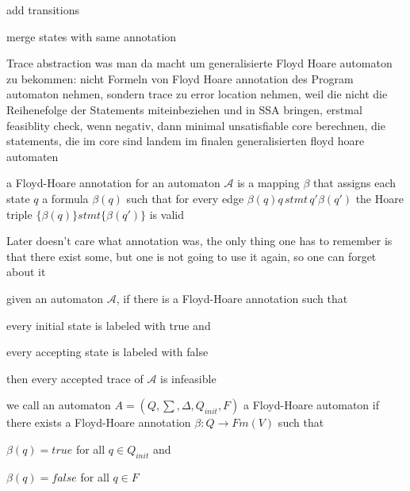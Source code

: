 \documentclass[a4paper]{article}
\begin{document}
\begin{minipage}[t]{0.16\linewidth}
\begin{betterlist}
{{\begin{betterlist}
\begin{enumerate}
					\end{enumerate}
					\begin{betterlist}
            \item \alert{Trace abstraction was man da macht um generalisierte Floyd Hoare automaton zu bekommen:} nicht Formeln von Floyd Hoare annotation des Program automaton nehmen, sondern trace zu error location nehmen, weil die nicht die Reihenefolge der Statements miteinbeziehen und in SSA bringen, erstmal feasiblity check, wenn negativ, dann minimal unsatisfiable core berechnen, die statements, die im core sind landem im finalen generalisierten floyd hoare automaten
						\item a \alert{Floyd-Hoare annotation} for an automaton $\mathcal{A}$ is a mapping $\beta$ that assigns each state $q$ a formula $\beta(q)$ such that for every edge $\beta (q)q\, stmt\, q'\beta(q')$ the Hoare triple $\{\beta(q)\} stmt \{\beta(q′)\}$ is valid
						\begin{betterlist}
							\item Later doesn't care what annotation was, the only thing one has to remember is that there exist some, but one is not going to use it again, so one can forget about it
						\end{betterlist}
						\item given an automaton $\mathcal{A}$, if there is a Floyd-Hoare annotation such that
						\begin{betterlist}
							\item every initial state is labeled with true and
							\item every accepting state is labeled with false
						\end{betterlist}
						then every accepted trace of $\mathcal{A}$ is infeasible
						\item we call an automaton $A = (Q, \sum , \Delta , Q_{init}, F)$ a \alert{Floyd-Hoare automaton} if there exists a Floyd-Hoare annotation $\beta  : Q \rightarrow Fm(V)$ such that
						\begin{betterlist}
							\item $\beta(q) = true$ for all $q \in Q_{init}$ and
							\item $\beta(q) = false$ for all $q \in F$
						\end{betterlist}

\end{betterlist}
\end{betterlist}}}
\end{betterlist}
\end{minipage}
\end{document}

